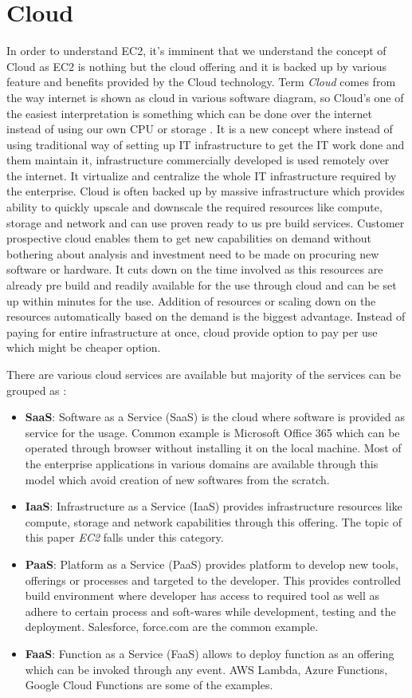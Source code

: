 \section{Cloud}
In order to understand EC2, it's imminent that we understand the concept of Cloud as EC2 is nothing but the cloud offering and it is backed up by various feature and benefits provided by the Cloud technology.  Term \emph{Cloud} comes from the way internet is shown as cloud in various software diagram, so Cloud's one of the easiest interpretation is something which can be done over the internet instead of using our own CPU or storage \cite{www-infoworld}. It is a new concept where instead of using traditional way of setting up IT infrastructure to get the IT work done and them maintain it, infrastructure commercially developed is used remotely over the internet. It virtualize and centralize the whole IT infrastructure required by the enterprise. Cloud is often backed up by massive infrastructure which provides ability to quickly upscale and downscale the required resources like compute, storage and network and can use proven ready to us pre build services. Customer prospective cloud enables them to get new capabilities on demand without bothering about analysis and investment need to be made on procuring new software or hardware. It cuts down on the time involved as this resources are already pre build and readily available for the use through cloud and can be set up within minutes for the use. Addition of resources or scaling down on the resources automatically based on the demand is the biggest advantage. Instead of paying for entire infrastructure at once, cloud provide option to pay per use which might be cheaper option.

There are various cloud services are available but majority of the services can be grouped as \cite{www-infoworld}: 
\begin{itemize}
\item {\bf SaaS}: Software as a Service (SaaS) is the cloud where software is provided as service for the usage. Common example is Microsoft Office 365 which can be operated through browser without installing it on the local machine. Most of the enterprise applications in various domains are available through this model which avoid creation of new softwares from the scratch.
\item {\bf IaaS}: Infrastructure as a Service (IaaS) provides infrastructure resources like compute, storage and network capabilities through this offering. The topic of this paper \emph{EC2} falls under this category.
\item {\bf PaaS}: Platform as a Service (PaaS) provides platform to develop new tools, offerings or processes and targeted to the developer. This provides controlled build environment where developer has access to required tool as well as adhere to certain process and soft-wares while development, testing and the deployment. Salesforce, force.com are the common example.
\item {\bf FaaS}: Function as a Service (FaaS) allows to deploy function as an offering which can be invoked through any event. AWS Lambda, Azure Functions, Google Cloud Functions are some of the examples.
\end{itemize}

